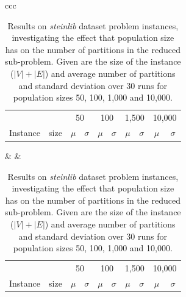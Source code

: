 \documentclass[journal]{IEEEtran}
\begin{document}
\begin{table}
\centering
\caption[Size of reduced sub-problem (full results)]{Results on \emph{steinlib} dataset problem instances, investigating the effect that population size has on the number of partitions in the reduced sub-problem. Given are the size of the instance (\(|V|+|E|\)) and average number of partitions and standard deviation over 30 runs for population sizes 50, 100, 1,000 and 10,000.}\label{tab:app:pop}
\begin{tabular}{ccc}
\centering
\begin{adjustbox}{width=0.48\textwidth}
\begin{tabular}{lrrrrrrrrr} \toprule
 &  & \multicolumn{2}{c}{50} & \multicolumn{2}{c}{100} & \multicolumn{2}{c}{1,500} & \multicolumn{2}{c}{10,000}\\
\cmidrule(lr){3-4} \cmidrule(lr){5-6} \cmidrule(lr){7-8} \cmidrule(lr){9-10} 
Instance & size & \multicolumn{1}{c}{\(\mu\)}&\multicolumn{1}{c}{\(\sigma\)} & \multicolumn{1}{c}{\(\mu\)}&\multicolumn{1}{c}{\(\sigma\)}& \multicolumn{1}{c}{\(\mu\)}&\multicolumn{1}{c}{\(\sigma\)} & \multicolumn{1}{c}{\(\mu\)}&\multicolumn{1}{c}{\(\sigma\)}\\ \midrule
%

%
\bottomrule
\end{tabular}
\end{adjustbox}
&  &
\centering
\begin{adjustbox}{width=0.48\textwidth}
\begin{tabular}{lrrrrrrrrr} \toprule
 &  & \multicolumn{2}{c}{50} & \multicolumn{2}{c}{100} & \multicolumn{2}{c}{1,500} & \multicolumn{2}{c}{10,000}\\
\cmidrule(lr){3-4} \cmidrule(lr){5-6} \cmidrule(lr){7-8} \cmidrule(lr){9-10} 
Instance & size & \multicolumn{1}{c}{\(\mu\)}&\multicolumn{1}{c}{\(\sigma\)} & \multicolumn{1}{c}{\(\mu\)}&\multicolumn{1}{c}{\(\sigma\)}& \multicolumn{1}{c}{\(\mu\)}&\multicolumn{1}{c}{\(\sigma\)} & \multicolumn{1}{c}{\(\mu\)}&\multicolumn{1}{c}{\(\sigma\)}\\ \midrule
%

%
\bottomrule
\end{tabular}
\end{adjustbox}


\end{tabular}
\end{table}
\end{document}
